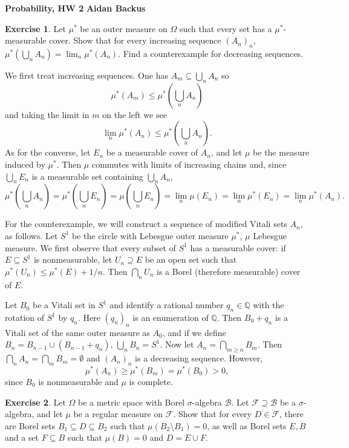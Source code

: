 \documentclass[10pt]{article}
\newcommand{\QQ}{\mathbb{Q}}
\theoremstyle{definition}
\newtheorem{exer}{Exercise}
\begin{document}
\noindent
\large\textbf{Probability, HW 2} \hfill \textbf{Aidan Backus} \\


\begin{exer}
Let $\mu^*$ be an outer measure on $\Omega$ such that every set has a $\mu^*$-measurable cover. Show that for every increasing sequence $(A_n)_n$, $\mu^*(\bigcup_n A_n) = \lim_n \mu^*(A_n)$. Find a counterexample for decreasing sequences.
\end{exer}

We first treat increasing sequences. One has $A_m \subseteq \bigcup_n A_n$ so
$$\mu^*(A_m) \leq \mu^*\left(\bigcup_n A_n\right)$$
and taking the limit in $m$ on the left we see
$$\lim_n \mu^*(A_n) \leq \mu^*\left(\bigcup_n A_n\right).$$
As for the converse, let $E_n$ be a measurable cover of $A_n$, and let $\mu$ be the measure induced by $\mu^*$. Then $\mu$ commutes with limits of increasing chains and, since $\bigcup_n E_n$ is a measurable set containing $\bigcup_n A_n$,
$$\mu^*\left(\bigcup_n A_n\right) = \mu^*\left(\bigcup_n E_n\right) = \mu\left(\bigcup_n E_n\right) = \lim_n \mu(E_n) = \lim_n \mu^*(E_n) = \lim_n \mu^*(A_n).$$

For the counterexample, we will construct a sequence of modified Vitali sets $A_n$, as follows.
Let $S^1$ be the circle with Lebesgue outer measure $\mu^*$, $\mu$ Lebesgue measure.
We first observe that every subset of $S^1$ has a measurable cover: if $E \subseteq S^1$ is nonmeasurable, let $U_n \supseteq E$ be an open set such that $\mu^*(U_n) \leq \mu^*(E) + 1/n$. Then $\bigcap_n U_n$ is a Borel (therefore measurable) cover of $E$.

Let $B_0$ be a Vitali set in $S^1$ and identify a rational number $q_n \in \QQ$ with the rotation of $S^1$ by $q_n$.
Here $(q_n)_n$ is an enumeration of $\QQ$.
Then $B_0 + q_n$ is a Vitali set of the same outer measure as $A_0$, and if we define $B_n = B_{n-1} \cup (B_{n-1} + q_n)$, $\bigcup_n B_n = S^1$.
Now let $A_n = \bigcap_{m\geq n} B_m$.
Then $\bigcap_n A_n = \bigcap_m B_m = \emptyset$ and $(A_n)_n$ is a decreasing sequence. However,
$$\mu^*(A_n) \geq \mu^*(B_m) = \mu^*(B_0) > 0,$$
since $B_0$ is nonmeasurable and $\mu$ is complete.

\begin{exer}
Let $\Omega$ be a metric space with Borel $\sigma$-algebra $\mathcal B$.
Let $\mathcal F \supseteq \mathcal B$ be a $\sigma$-algebra, and let $\mu$ be a regular measure on $\mathcal F$.
Show that for every $D \in \mathcal F$, there are Borel sets $B_1 \subseteq D \subseteq B_2$ such that $\mu(B_2 \setminus B_1) = 0$, as well as Borel sets $E,B$ and a set $F \subseteq B$ such that $\mu(B) = 0$ and $D = E \cup F$.
\end{exer}
\end{document}
